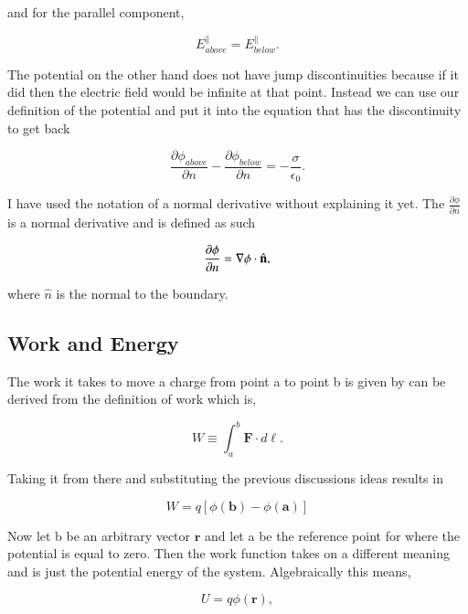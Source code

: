 \documentclass[preprint, review,12pt]{elsarticle}
\def\.{\cdot}
\def\b{\textbf}
\def\bell{\bm{\ell}}
\begin{document}
and for the parallel component,

\begin{equation}
    E_{above}^\parallel = E_{below}^\parallel.
\end{equation}

The potential on the other hand does not have jump discontinuities because if it did then the electric field would be infinite at that point. Instead we can use our definition of the potential and put it into the equation that has the discontinuity to get back

\begin{equation}
    \frac{\partial \phi_{above}}{\partial n} - \frac{\partial \phi_{below}}{\partial n} = -\frac{\sigma}{\epsilon_0}.
\end{equation}

I have used the notation of a normal derivative without explaining it yet. The $\frac{\partial \phi}{\partial n}$ is a normal derivative and is defined as such

\begin{equation}
    \frac{\partial \phi}{\partial n} = \nabla \phi \. \hat{\b n},
\end{equation}

where $\hat{n}$ is the normal to the boundary. 


\subsection{Work and Energy}

The work it takes to move a charge from point a to point b is given by can be derived from the definition of work which is,

\begin{equation}
    W \equiv \int_a^b \b{F}\. d\bell.
\end{equation}

Taking it from there and substituting the previous discussions ideas results in

\begin{equation}
    W = q[\phi(\b{b})-\phi(\b{a})]
\end{equation}

Now let b be an arbitrary vector $\b{r}$ and let a be the reference point for where the potential is equal to zero. Then the work function takes on a different meaning and is just the potential energy of the system. Algebraically this means,

\begin{equation}
    U = q\phi(\b{r}),
\end{equation}
\end{document}
